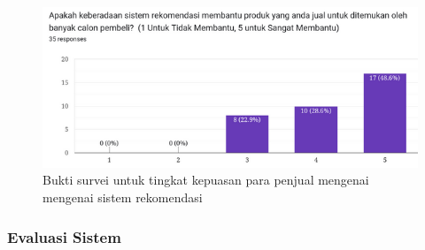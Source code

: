 \documentclass[a4paper]{article}
\newcommand{\subsubbab}[1]{%
    \subsubsection{#1}%
}
\begin{document}
\begin{enumerate}
\begin{itemize}
        \begin{figure}[h]
            \centering
            \includegraphics[scale=0.50]{images/evaluasi ui merchant 2/Survei 3 - Pertanyaan 2.png}
            \caption{Bukti survei untuk tingkat kepuasan para penjual mengenai mengenai sistem rekomendasi}
            \label{fig:merchantRecommendation}
        \end{figure}

    \end{itemize}

\end{enumerate}

\newpage
\subsubbab{Evaluasi Sistem}
\end{document}
